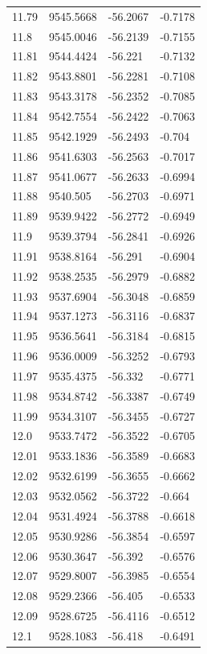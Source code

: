 \begin{table}[H]
\begin{tabular}{llll}
11.79 & 9545.5668 & -56.2067 & -0.7178 \\
11.8 & 9545.0046 & -56.2139 & -0.7155 \\
11.81 & 9544.4424 & -56.221 & -0.7132 \\
11.82 & 9543.8801 & -56.2281 & -0.7108 \\
11.83 & 9543.3178 & -56.2352 & -0.7085 \\
11.84 & 9542.7554 & -56.2422 & -0.7063 \\
11.85 & 9542.1929 & -56.2493 & -0.704 \\
11.86 & 9541.6303 & -56.2563 & -0.7017 \\
11.87 & 9541.0677 & -56.2633 & -0.6994 \\
11.88 & 9540.505 & -56.2703 & -0.6971 \\
11.89 & 9539.9422 & -56.2772 & -0.6949 \\
11.9 & 9539.3794 & -56.2841 & -0.6926 \\
11.91 & 9538.8164 & -56.291 & -0.6904 \\
11.92 & 9538.2535 & -56.2979 & -0.6882 \\
11.93 & 9537.6904 & -56.3048 & -0.6859 \\
11.94 & 9537.1273 & -56.3116 & -0.6837 \\
11.95 & 9536.5641 & -56.3184 & -0.6815 \\
11.96 & 9536.0009 & -56.3252 & -0.6793 \\
11.97 & 9535.4375 & -56.332 & -0.6771 \\
11.98 & 9534.8742 & -56.3387 & -0.6749 \\
11.99 & 9534.3107 & -56.3455 & -0.6727 \\
12.0 & 9533.7472 & -56.3522 & -0.6705 \\
12.01 & 9533.1836 & -56.3589 & -0.6683 \\
12.02 & 9532.6199 & -56.3655 & -0.6662 \\
12.03 & 9532.0562 & -56.3722 & -0.664 \\
12.04 & 9531.4924 & -56.3788 & -0.6618 \\
12.05 & 9530.9286 & -56.3854 & -0.6597 \\
12.06 & 9530.3647 & -56.392 & -0.6576 \\
12.07 & 9529.8007 & -56.3985 & -0.6554 \\
12.08 & 9529.2366 & -56.405 & -0.6533 \\
12.09 & 9528.6725 & -56.4116 & -0.6512 \\
12.1 & 9528.1083 & -56.418 & -0.6491 \\

\end{tabular}
\end{table}
